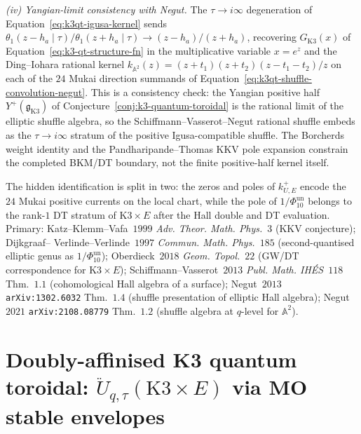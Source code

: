 \begin{remark}
\emph{(iv) Yangian-limit consistency with Negut.} The $\tau \to i\infty$
degeneration of Equation~\eqref{eq:k3qt-igusa-kernel} sends
$\theta_1(z - h_a \mid \tau)/\theta_1(z + h_a \mid \tau) \to
(z - h_a)/(z + h_a)$, recovering $G_{\mathrm K3}(x)$ of
Equation~\eqref{eq:k3-qt-structure-fn} in the multiplicative variable
$x = e^z$ and the Ding--Iohara rational kernel
$k_{\mathbb A^2}(z) = (z + t_1)(z + t_2)(z - t_1 - t_2)/z$ on each of
the $24$ Mukai direction summands of
Equation~\eqref{eq:k3qt-shuffle-convolution-negut}. This is a
consistency check: the Yangian positive half
$Y^+(\mathfrak g_{\mathrm K3})$ of
Conjecture~\ref{conj:k3-quantum-toroidal} is the rational limit of
the elliptic shuffle algebra, so the Schiffmann--Vasserot--Negut
rational shuffle embeds as the $\tau \to i\infty$ stratum of the
positive Igusa-compatible shuffle. The Borcherds weight identity and
the Pandharipande--Thomas KKV pole expansion constrain the completed
BKM/DT boundary, not the finite positive-half kernel itself.

The hidden identification is split in two: the zeros and poles of
\(k^+_{U,E}\) encode the \(24\) Mukai positive currents on the local chart,
while the pole of \(1/\Phi_{10}^{\mathrm{un}}\) belongs to the rank-$1$ DT stratum of
$\mathrm{K3}\times E$ after the Hall double and DT evaluation. Primary:
Katz--Klemm--Vafa~$1999$
\emph{Adv. Theor. Math. Phys.}~$3$ (KKV conjecture); Dijkgraaf--
Verlinde--Verlinde~$1997$ \emph{Commun. Math. Phys.}~$185$
(second-quantised elliptic genus as \(1/\Phi_{10}^{\mathrm{un}}\)); Oberdieck~$2018$
\emph{Geom. Topol.}~$22$ (GW/DT correspondence for
$\mathrm{K3}\times E$);
Schiffmann--Vasserot~$2013$ \emph{Publ. Math. IH\'ES}~$118$ Thm.~$1.1$
(cohomological Hall algebra of a surface);
Negut~$2013$ \texttt{arXiv:1302.6032} Thm.~$1.4$
(shuffle presentation of elliptic Hall algebra);
Negut~$2021$ \texttt{arXiv:2108.08779} Thm.~$1.2$
(shuffle algebra at $q$-level for $\mathbb A^2$).
\end{remark}

\section{Doubly-affinised K3 quantum toroidal:
\texorpdfstring{$\ddot U_{q, \tau}(\mathrm K3 \times E)$}{ddot U-q, tau(K3 x E)} via MO stable envelopes}
\label{sec:k3qt-doubly-affine-uuy-bispectral}

